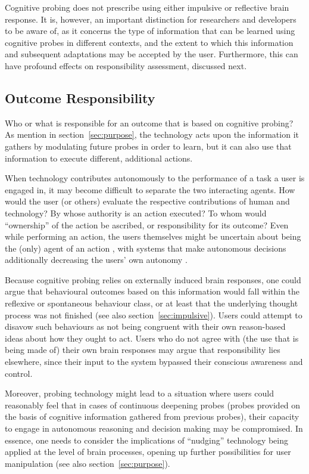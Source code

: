 Cognitive probing does not prescribe using either impulsive or reflective brain response. It is, however, an important distinction for researchers and developers to be aware of, as it concerns the type of information that can be learned using cognitive probes in different contexts, and the extent to which this information and subsequent adaptations may be accepted by the user. Furthermore, this can have profound effects on responsibility assessment, discussed next.


\subsection{Outcome Responsibility}

Who or what is responsible for an outcome that is based on cognitive probing? As mention in section~\ref{sec:purpose}, the technology acts upon the information it gathers by modulating future probes in order to learn, but it can also use that information to execute different, additional actions. 

When technology contributes autonomously to the performance of a task a user is engaged in, it may become difficult to separate the two interacting agents. How would the user (or others) evaluate the respective contributions of human and technology? By whose authority is an action executed? To whom would ``ownership'' of the action be ascribed, or responsibility for its outcome? Even while performing an action, the users themselves might be uncertain about being the (only) agent of an action \cite{haselager2013agency}, with systems that make autonomous decisions additionally decreasing the users' own autonomy \cite{friedrich2018bciautonomy}.

Because cognitive probing relies on externally induced brain responses, one could argue that behavioural outcomes based on this information would fall within the reflexive or spontaneous behaviour class, or at least that the underlying thought process was not finished (see also section~\ref{sec:impulsive}). Users could attempt to disavow such behaviours as not being congruent with their own reason-based ideas about how they ought to act. Users who do not agree with (the use that is being made of) their own brain responses may argue that responsibility lies elsewhere, since their input to the system bypassed their conscious awareness and control.

Moreover, probing technology might lead to a situation where users could reasonably feel that in cases of continuous deepening probes (probes provided on the basis of cognitive information gathered from previous probes), their capacity to engage in autonomous reasoning and decision making may be compromised. In essence, one needs to consider the implications of ``nudging'' technology being applied at the level of brain processes, opening up further possibilities for user manipulation (see also section~\ref{sec:purpose}).

